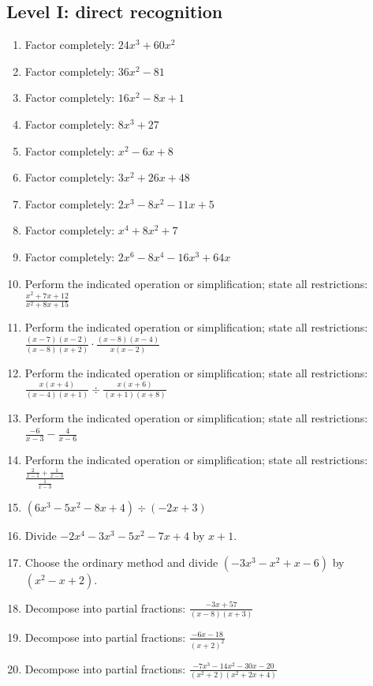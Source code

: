 \documentclass[11pt,oneside]{book}
\begin{document}
\subsection*{Level I: direct recognition}
\begin{enumerate}[leftmargin=*,label=\textbf{\arabic*.},itemsep=0.65\baselineskip]
\item Factor completely: $ 24 x^{3} + 60 x^{2} $
\item Factor completely: $ 36 x^{2} - 81 $
\item Factor completely: $ 16 x^{2} - 8 x + 1 $
\item Factor completely: $ 8 x^{3} + 27 $
\item Factor completely: $ x^{2} - 6 x + 8 $
\item Factor completely: $ 3 x^{2} + 26 x + 48 $
\item Factor completely: $ 2 x^{3} - 8 x^{2} - 11 x + 5 $
\item Factor completely: $ x^{4} + 8 x^{2} + 7 $
\item Factor completely: $ 2 x^{6} - 8 x^{4} - 16 x^{3} + 64 x $
\item Perform the indicated operation or simplification; state all restrictions: $\displaystyle \frac{x^{2} + 7 x + 12}{x^{2} + 8 x + 15}$
\item Perform the indicated operation or simplification; state all restrictions: $\displaystyle \frac{\left(x - 7\right) \left(x - 2\right)}{\left(x - 8\right) \left(x + 2\right)}\cdot\frac{\left(x - 8\right) \left(x - 4\right)}{x \left(x - 2\right)}$
\item Perform the indicated operation or simplification; state all restrictions: $\displaystyle \frac{x \left(x + 4\right)}{\left(x - 4\right) \left(x + 1\right)}\div\frac{x \left(x + 6\right)}{\left(x + 1\right) \left(x + 8\right)}$
\item Perform the indicated operation or simplification; state all restrictions: $\displaystyle \frac{-6}{x - 3}-\frac{4}{x - 6}$
\item Perform the indicated operation or simplification; state all restrictions: $\displaystyle \frac{\frac{2}{x - 1} + \frac{1}{x - 3}}{\frac{1}{x - 3}}$
\item $\displaystyle (6 x^{3} - 5 x^{2} - 8 x + 4)\div(- 2 x + 3)$
\item Divide $ - 2 x^{4} - 3 x^{3} - 5 x^{2} - 7 x + 4 $ by $x + 1$.
\item Choose the ordinary method and divide $(- 3 x^{3} - x^{2} + x - 6)$ by $(x^{2} - x + 2)$.
\item Decompose into partial fractions: $\displaystyle \frac{- 3 x + 57}{\left(x - 8\right) \left(x + 3\right)}$
\item Decompose into partial fractions: $\displaystyle \frac{- 6 x - 18}{\left(x + 2\right)^{2}}$
\item Decompose into partial fractions: $\displaystyle \frac{- 7 x^{3} - 14 x^{2} - 30 x - 20}{\left(x^{2} + 2\right) \left(x^{2} + 2 x + 4\right)}$
\end{enumerate}
\end{document}
